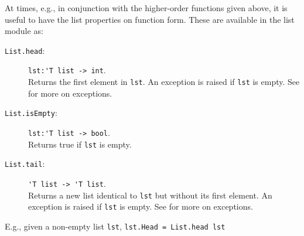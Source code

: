 \documentclass[fsharpNotes.tex]{subfiles}
\begin{document}
At times, e.g., in conjunction with the higher-order functions given above, it is useful to have the list properties on function form. These are available in the list module as:
\begin{description}
\item[\texttt{List.head}:] \lstinline{lst:'T list -> int}.~\\
  Returns the first element in \lstinline{lst}. An exception is raised if \lstinline{lst} is empty. See  for more on exceptions.
\item[\texttt{List.isEmpty}:]  \lstinline{lst:'T list -> bool}.~\\
  Returns true if \lstinline{lst} is empty.
\item[\texttt{List.tail}:]  \lstinline{'T list -> 'T list}.~\\
  Returns a new list identical to \lstinline{lst} but without its first element. An exception is raised if \lstinline{lst} is empty. See  for more on exceptions.
\end{description}
E.g., given a non-empty list \lstinline{lst}, \lstinline{lst.Head = List.head lst}
\end{document}
